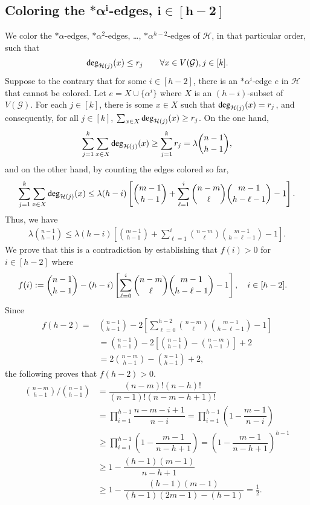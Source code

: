 \documentclass[12pt,oneside]{amsart}
\newcommand\dg{\operatorname{\textup{{\fontfamily{ptm}\selectfont deg}}}}
\newcommand{\cc}{\mathcal}
\begin{document}
\subsection{Coloring the \texorpdfstring{$\bm{*\alpha^i}$}{p}-edges, \texorpdfstring{$\bm{i\in [h-2]}$}{p}} \label{coloringIsubsec}
We color the $*\alpha$-edges, $*\alpha^2$-edges, \dots, $*\alpha^{h-2}$-edges of $\cc H$, in that particular order,  such that 
\begin{align} \label{eq:dg_h-2}
     \dg_{\cc H(j)}(x)\leq r_j
\qquad   \forall x \in V(\cc G), j\in [k].
\end{align}
Suppose to the contrary that for some $i\in [h-2]$, there is an $*\alpha^{i}$-edge $e$ in $\cc H$  that cannot be colored. Let $e=X\cup \{\alpha^i\}$ where $X$ is an $(h-i)$-subset  of $V(\cc G)$. For each $j\in[k]$, there is some $x\in X$ such that $\dg_{\cc H(j)}(x)=r_j$, and consequently, for all $j\in[k]$, $\sum_{x\in X}\dg_{\cc H(j)}(x)\geq r_j$. On the one hand,
$$\sum_{j=1}^k\sum_{x\in X}\dg_{\cc H(j)}(x)\geq \sum_{j=1}^k r_j = \lambda\binom{n-1}{h-1},$$
and on the other hand, by counting the edges colored so far,
$$\sum_{j=1}^k\sum_{x\in X}\dg_{\cc H(j)}(x)\leq \lambda(h-i)\left[\binom{m-1}{h-1} + \sum_{\ell=1}^i\binom{n-m}{\ell}\binom{m-1}{h-\ell-1}-1\right].$$
Thus, we have
\begin{align*}
    \lambda\binom{n-1}{h-1}\leq \lambda(h-i)\left[\binom{m-1}{h-1}+\sum_{\ell=1}^i\binom{n-m}{\ell}\binom{m-1}{h-\ell-1}-1\right].
\end{align*}
We  prove that this is a contradiction by establishing that $f(i)> 0$ for $i\in [h-2]$ where
\begin{align*}
    f(i) &:= \dbinom{n-1}{h-1} - (h-i)\left[\sum_{\ell=0}^{i}\dbinom{n-m}{\ell}\dbinom{m-1}{h-\ell-1} - 1\right], \quad i\in [h-2].
\end{align*}
Since 
\begin{align*}
    f(h-2) =& \binom{n-1}{h-1} - 2\left[\sum_{\ell=0}^{h-2}\binom{n-m}{\ell}\binom{m-1}{h-\ell-1}-1\right]\\
    &= \binom{n-1}{h-1} - 2\left[ \binom{n-1}{h-1} -  \binom{n-m}{h-1}\right]+2\\
    &= 2\binom{n-m}{h-1} - \binom{n-1}{h-1} + 2,
\end{align*}
the following proves that $f(h-2)> 0$.
\begin{align*}
    \binom{n-m}{h-1}\bigg/\binom{n-1}{h-1} &= \dfrac{(n-m)!(n-h)!}{(n-1)!(n-m-h+1)!}\\
    &= \prod_{i=1}^{h-1}\dfrac{n-m-i+1}{n-i}= \prod_{i=1}^{h-1}\left(1-\dfrac{m-1}{n-i}\right)\\
    &\geq \prod_{i=1}^{h-1}\left(1-\dfrac{m-1}{n-h+1}\right)
    = \left(1 - \dfrac{m-1}{n-h+1}\right)^{h-1}\\
   &\geq 1 - \dfrac{(h-1)(m-1)}{n-h+1}\\
    &\geq 1 - \dfrac{(h-1)(m-1)}{(h-1)(2m-1)-(h-1)}
    = \frac{1}{2}.
\end{align*}
\end{document}

